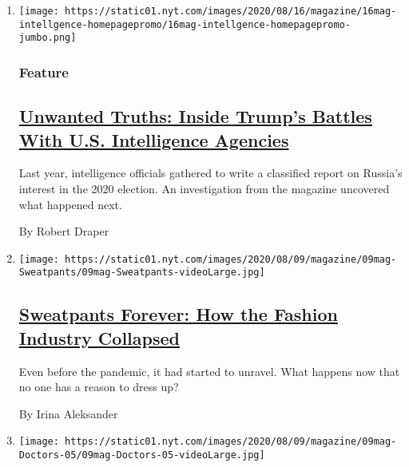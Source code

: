 \begin{enumerate}
\def\labelenumi{\arabic{enumi}.}
\item
  \texttt{[image: https://static01.nyt.com/images/2020/08/16/magazine/16mag-intellgence-homepagepromo/16mag-intellgence-homepagepromo-jumbo.png]}

  \hypertarget{feature}{%
  \subsubsection{Feature}\label{feature}}

  \hypertarget{unwanted-truths-inside-trumps-battles-with-us-intelligence-agencies}{%
  \subsection{\texorpdfstring{\href{/2020/08/08/magazine/us-russia-intelligence.html}{Unwanted
  Truths: Inside Trump's Battles With U.S. Intelligence
  Agencies}}{Unwanted Truths: Inside Trump's Battles With U.S. Intelligence Agencies}}\label{unwanted-truths-inside-trumps-battles-with-us-intelligence-agencies}}

  Last year, intelligence officials gathered to write a classified
  report on Russia's interest in the 2020 election. An investigation
  from the magazine uncovered what happened next.

  By Robert Draper
\item
  \texttt{[image: https://static01.nyt.com/images/2020/08/09/magazine/09mag-Sweatpants/09mag-Sweatpants-videoLarge.jpg]}

  \hypertarget{sweatpants-forever-how-the-fashion-industry-collapsed}{%
  \subsection{\texorpdfstring{\href{/interactive/2020/08/06/magazine/fashion-sweatpants.html}{Sweatpants
  Forever: How the Fashion Industry
  Collapsed}}{Sweatpants Forever: How the Fashion Industry Collapsed}}\label{sweatpants-forever-how-the-fashion-industry-collapsed}}

  Even before the pandemic, it had started to unravel. What happens now
  that no one has a reason to dress up?

  By Irina Aleksander
\item
  \texttt{[image: https://static01.nyt.com/images/2020/08/09/magazine/09mag-Doctors-05/09mag-Doctors-05-videoLarge.jpg]}

  \hypertarget{the-covid-drug-wars-that-pitted-doctor-vs-doctor}{%
}
\end{enumerate}
